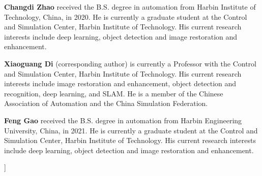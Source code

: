 \begin{sloppypar}
\begin{@twocolumnfalse}
\begin{itemize}
\textbf{Changdi Zhao} received the B.S. degree in automation from Harbin Institute of Technology, China, in 2020. He is currently a graduate student at the Control and Simulation Center, Harbin Institute of Technology. His current research interests include deep learning, object detection and image restoration and enhancement.

\textbf{Xiaoguang Di} (corresponding author) is currently a Professor with the Control and Simulation Center, Harbin Institute of Technology. His current research interests include image restoration and enhancement, object detection and recognition, deep learning, and SLAM. He is a member of the Chinese Association of Automation and the China Simulation Federation.

\textbf{Feng Gao} received the B.S. degree in automation from Harbin Engineering University, China, in 2021. He is currently a graduate student at the Control and Simulation Center, Harbin Institute of Technology. His current research interests include deep learning, object detection and image restoration and enhancement.


\end{itemize}
\end{@twocolumnfalse}
]

\clearpage


\end{sloppypar}
%
%


